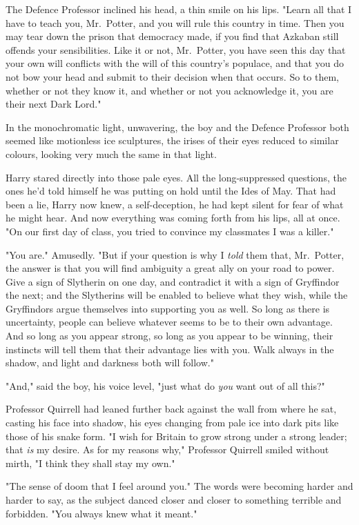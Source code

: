 The Defence Professor inclined his head, a thin smile on his lips. "Learn all
that I have to teach you, Mr.~Potter, and you will rule this country in time.
Then you may tear down the prison that democracy made, if you find that Azkaban
still offends your sensibilities. Like it or not, Mr.~Potter, you have seen
this day that your own will conflicts with the will of this country's populace,
and that you do not bow your head and submit to their decision when that
occurs. So to them, whether or not they know it, and whether or not you
acknowledge it, you are their next Dark Lord."

In the monochromatic light, unwavering, the boy and the Defence Professor both
seemed like motionless ice sculptures, the irises of their eyes reduced to
similar colours, looking very much the same in that light.

Harry stared directly into those pale eyes. All the long-suppressed questions,
the ones he'd told himself he was putting on hold until the Ides of May. That
had been a lie, Harry now knew, a self-deception, he had kept silent for fear
of what he might hear. And now everything was coming forth from his lips, all
at once. "On our first day of class, you tried to convince my classmates I was
a killer."

"You are." Amusedly. "But if your question is why I \emph{told} them that,
Mr.~Potter, the answer is that you will find ambiguity a great ally on your
road to power. Give a sign of Slytherin on one day, and contradict it with a
sign of Gryffindor the next; and the Slytherins will be enabled to believe what
they wish, while the Gryffindors argue themselves into supporting you as well.
So long as there is uncertainty, people can believe whatever seems to be to
their own advantage. And so long as you appear strong, so long as you appear to
be winning, their instincts will tell them that their advantage lies with you.
Walk always in the shadow, and light and darkness both will follow."

"And," said the boy, his voice level, "just what do \emph{you} want out of all
this?"

Professor Quirrell had leaned further back against the wall from where he sat,
casting his face into shadow, his eyes changing from pale ice into dark pits
like those of his snake form. "I wish for Britain to grow strong under a strong
leader; that \emph{is} my desire. As for my reasons why," Professor Quirrell
smiled without mirth, "I think they shall stay my own."

"The sense of doom that I feel around you." The words were becoming harder and
harder to say, as the subject danced closer and closer to something terrible
and forbidden. "You always knew what it meant."

